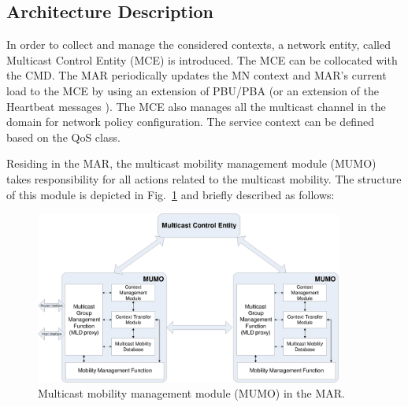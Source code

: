 \subsection{Architecture Description}
In order to collect and manage the considered contexts, a network entity, called Multicast Control Entity (MCE) is introduced. The MCE can be collocated with the CMD. The MAR periodically updates the MN context and MAR's current load to the MCE by using an extension of PBU/PBA (or an extension of the Heartbeat messages \cite{heartbeat}). The MCE also manages all the multicast channel in the domain for network policy configuration. The service context can be defined based on the QoS class. 

Residing in the MAR, the multicast mobility management module (MUMO) takes responsibility for all actions related to the multicast mobility. The structure of this module is depicted in Fig.~\ref{fig:multicast_module} and briefly described as follows: 

\begin{figure}[t!]
 	\begin{center} 
		\includegraphics[width=0.90\textwidth]{./Part3/Chapter8/figures/c10_mume.eps}
		\caption{Multicast mobility management module (MUMO) in the MAR.}
		\label{fig:multicast_module}
	\end{center}
\end{figure}

